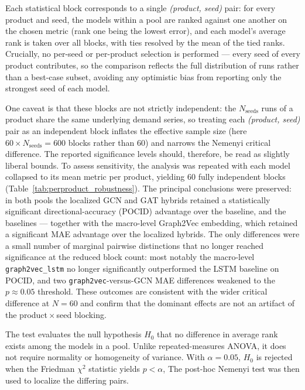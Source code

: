 Each statistical block corresponds to a single \emph{(product, seed)} pair: for
every product and seed, the models within a pool are ranked against one another
on the chosen metric (rank one being the lowest error), and each model's average
rank is taken over all blocks, with ties resolved by the mean of the tied ranks.
Crucially, no per-seed or per-product selection is performed --- every seed of
every product contributes, so the comparison reflects the full distribution of
runs rather than a best-case subset, avoiding any optimistic bias from reporting
only the strongest seed of each model.

One caveat is that these blocks are not strictly independent: the
$N_{\text{seeds}}$ runs of a product share the same underlying demand series, so
treating each \emph{(product, seed)} pair as an independent block inflates the
effective sample size (here $60 \times N_{\text{seeds}} = 600$ blocks rather than
$60$) and narrows the Nemenyi critical difference. The reported significance
levels should, therefore, be read as slightly liberal bounds. To assess
sensitivity, the analysis was repeated with each model collapsed to its mean
metric per product, yielding $60$ fully independent blocks
(Table~\ref{tab:perproduct_robustness}). The principal conclusions were
preserved: in both pools the localized GCN and GAT hybrids retained a
statistically significant directional-accuracy (POCID) advantage over the
baseline, and the baselines --- together with the macro-level Graph2Vec
embedding, which retained a significant MAE advantage over the localized hybrids.
The only differences were a small number of marginal pairwise distinctions that
no longer reached significance at the reduced block count: most notably the
macro-level \texttt{graph2vec\_lstm} no longer significantly outperformed the
LSTM baseline on POCID, and two \texttt{graph2vec}-versus-GCN MAE differences
weakened to the $p \approx 0.05$ threshold. These outcomes are consistent with the
wider critical difference at $N=60$ and confirm that the dominant effects are not
an artifact of the product\,$\times$\,seed blocking.

The test evaluates the null hypothesis $H_{0}$ that no difference in average rank
exists among the models in a pool. Unlike repeated-measures ANOVA, it
does not require normality or homogeneity of variance. With $\alpha = 0.05$,
$H_{0}$ is rejected when the Friedman $\chi^{2}$ statistic yields $p < \alpha$,
The post-hoc Nemenyi test was then used to localize the differing pairs.

